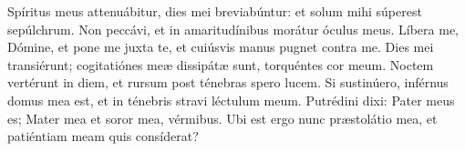 Spíritus meus attenuábitur, dies mei breviabúntur:
	et solum mihi súperest sepúlchrum.
Non peccávi, et in amaritudínibus morátur óculus meus.
Líbera me, Dómine, et pone me juxta te,
	et cuiúsvis manus pugnet contra me.
Dies mei transiérunt;
	cogitatiónes meæ dissipátæ sunt, torquéntes cor meum.
Noctem vertérunt in diem, et rursum post ténebras spero lucem.
Si sustinúero, inférnus domus mea est,
	et in ténebris stravi léctulum meum.
Putrédini dixi: Pater meus es;
	Mater mea et soror mea, vérmibus.
Ubi est ergo nunc præstolátio mea,
	et patiéntiam meam quis consíderat?
